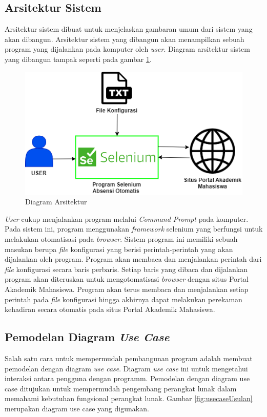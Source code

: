 \subsection{Arsitektur Sistem}
Arsitektur sistem dibuat untuk menjelaskan gambaran umum dari sistem yang akan dibangun. Arsitektur sistem yang dibangun akan menampilkan sebuah program yang dijalankan pada komputer oleh \textit{user}. Diagram arsitektur sistem yang dibangun tampak seperti pada gambar \ref{fig:arsiSistem}.
\begin{figure}[H]
	\centering
	\includegraphics[scale=0.6]{Gambar/arsitekturSistem.png}
	\caption{Diagram Arsitektur} 
	\label{fig:arsiSistem}
\end{figure}
\textit{User} cukup menjalankan program melalui \textit{Command Prompt} pada komputer. Pada sistem ini, program menggunakan \textit{framework} selenium yang berfungsi untuk melakukan otomatisasi pada \textit{browser}. Sistem program ini memiliki sebuah masukan berupa \textit{file} konfigurasi yang berisi perintah-perintah yang akan dijalankan oleh program. Program akan membaca dan menjalankan perintah dari \textit{file} konfigurasi secara baris perbaris. Setiap baris yang dibaca dan dijalankan program akan diteruskan untuk mengotomatisasi \textit{browser} dengan situs Portal Akademik Mahasiswa. Program akan terus membaca dan menjalankan setiap perintah pada \textit{file} konfigurasi hingga akhirnya dapat melakukan perekaman kehadiran secara otomatis pada situs Portal Akademik Mahasiswa. 

\subsection{Pemodelan Diagram \textit{Use Case}}
Salah satu cara untuk mempermudah pembangunan program adalah membuat pemodelan dengan diagram \textit{use case}. Diagram \textit{use case} ini untuk mengetahui interaksi antara pengguna dengan programm. Pemodelan dengan diagram use case ditujukan untuk mempermudah pengembang perangkat lunak dalam memahami kebutuhan fungsional perangkat lunak. Gambar \ref{fig:usecaseUsulan} merupakan diagram use case yang digunakan.

